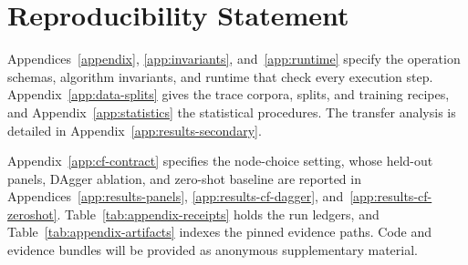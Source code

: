 \section*{Reproducibility Statement}

Appendices~\ref{appendix}, \ref{app:invariants}, and~\ref{app:runtime} specify the operation schemas, algorithm invariants, and runtime that check every execution step. Appendix~\ref{app:data-splits} gives the trace corpora, splits, and training recipes, and Appendix~\ref{app:statistics} the statistical procedures. The transfer analysis is detailed in Appendix~\ref{app:results-secondary}.

Appendix~\ref{app:cf-contract} specifies the node-choice setting, whose held-out panels, DAgger ablation, and zero-shot baseline are reported in Appendices~\ref{app:results-panels}, \ref{app:results-cf-dagger}, and~\ref{app:results-cf-zeroshot}. Table~\ref{tab:appendix-receipts} holds the run ledgers, and Table~\ref{tab:appendix-artifacts} indexes the pinned evidence paths. Code and evidence bundles will be provided as anonymous supplementary material.
